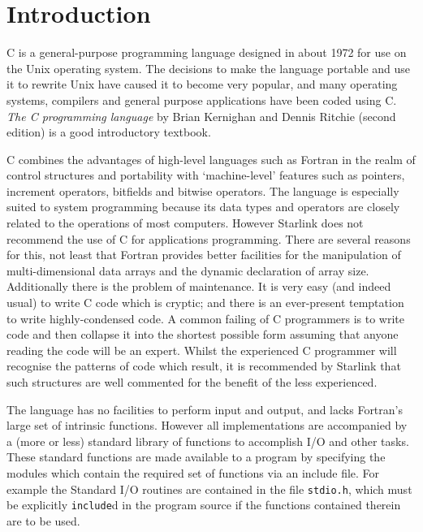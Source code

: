 
\newcommand{\srule}[1]
      {\addtocounter{sruleno}{1}
      \goodbreak
      \rule[0.5ex]{\textwidth}{0.3mm}
      {\Large #1 \hfill {\thesruleno}}
      \rule[0.5ex]{\textwidth}{0.1mm}  }
\renewcommand{\_}{{\tt\char'137}}


\section{Introduction}

C is a general-purpose programming language designed in about 1972 for use on the Unix 
operating system.
The decisions to make the language portable and use it to rewrite Unix have
caused it to become very popular, and many operating systems, compilers and 
general purpose applications have been coded using C.
{\sl The C programming language} by Brian Kernighan and Dennis Ritchie (second 
edition) is a good introductory textbook.

C combines the advantages of high-level languages such as Fortran in the
realm of control structures and portability with `machine-level' features
such as pointers, increment operators, bitfields and bitwise
operators. The language  is especially suited to system programming because
its data types and operators are closely related to the operations of most
computers. However Starlink does not recommend the use of C for
applications programming. There are several reasons for this, not least
that Fortran provides better facilities for the manipulation of
multi-dimensional data arrays and the dynamic declaration of array size. 
Additionally there is the problem of maintenance.
It is very easy (and indeed usual) to write C code which is cryptic; and there 
is an ever-present temptation to write highly-condensed code.
A common failing of C programmers is to write code and then collapse it
into the shortest possible form assuming that anyone reading the code will be 
an expert.
Whilst the experienced C programmer will recognise the patterns of code 
which result, it is recommended by Starlink  
that such structures are well commented for the benefit of the less
experienced.

The language has no facilities to perform input and output, and lacks 
Fortran's large set of intrinsic functions.
However all implementations are accompanied by a (more or less) standard 
library of functions to accomplish I/O and other tasks.
These standard functions are made available to  a program by specifying
the modules  which contain the required set of functions via an include file.
For example the Standard I/O routines are contained in the file {\tt stdio.h},
which must be explicitly {\tt include}d in the program source if the functions 
contained therein are to be used.

